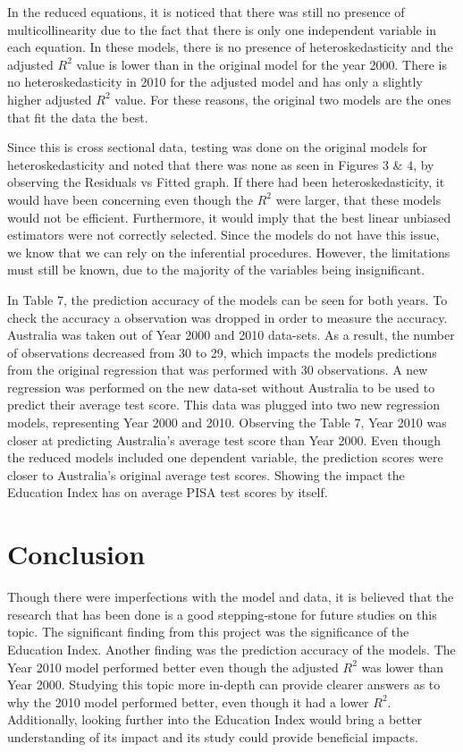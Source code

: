\documentclass[12pt,english]{article}
\begin{document}
In the reduced equations, it is noticed that there was still no presence of multicollinearity due to the fact that there is only one independent variable in each equation. In these models, there is no presence of heteroskedasticity and the adjusted $R^2$ value is lower than in the original model for the year 2000. There is no heteroskedasticity in 2010 for the adjusted model and has only a slightly higher adjusted $R^2$ value. For these reasons, the original two models are the ones that fit the data the best.

Since this is cross sectional data, testing was done on the original models for heteroskedasticity and noted that there was none as seen in Figures 3 \& 4, by observing the Residuals vs Fitted graph. If there had been heteroskedasticity, it would have been concerning even though the $R^2$ were larger, that these models would not be efficient. Furthermore, it would imply that the best linear unbiased estimators were not correctly selected. Since the models do not have this issue, we know that we can rely on the inferential procedures. However, the limitations must still be known, due to the majority of the variables being insignificant. 

In Table 7, the prediction accuracy of the models can be seen for both years. To check the accuracy a observation was dropped in order to measure the accuracy. Australia was taken out of Year 2000 and 2010 data-sets. As a result, the number of observations decreased from 30 to 29, which impacts the models predictions from the original regression that was performed with 30 observations. A new regression was performed on the new data-set without Australia to be used to predict their average test score. This data was plugged into two new regression models, representing Year 2000 and 2010. Observing the Table 7, Year 2010 was closer at predicting Australia's average test score than Year 2000. Even though the reduced models included one dependent variable, the prediction scores were closer to Australia's original average test scores. Showing the impact the Education Index has on average PISA test scores by itself. 


\section{Conclusion}
Though there were imperfections with the model and data, it is believed that the research that has been done is a good stepping-stone for future studies on this topic. The significant finding from this project was the significance of the Education Index. Another finding was the prediction accuracy of the models. The Year 2010 model performed better even though the adjusted $R^2$ was lower than Year 2000. Studying this topic more in-depth can provide clearer answers as to why the 2010 model performed better, even though it had a lower $R^2$. Additionally, looking further into the Education Index would bring a better understanding of its impact and its study could provide beneficial impacts. 
\end{document}

